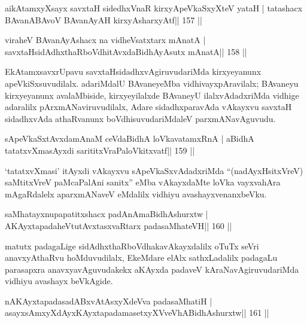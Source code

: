 \begin{shl}
aikAtamxyXsayx savxtaH sidedhxVnaR kirxyA\s peVkaSxyXteV yataH |
tatashacx BAvanABAvoV BAvanAyAH kirxyAsharxyAtf\hfill || 157 ||
\end{shl}

\begin{shl}
viraheV BAvanAyAshacx na vidheVsatxtarx mAnatA |
savxtaHsidAdhxthaRboVdhitAvxdaBidhAyAsutx mAnatA\hfill || 158 ||
\end{shl}

\begin{artha}
EkAtamxsavxrUpavu savxtaHsidadhxvAgiruvudariMda kirxyeyanunx apeVkiSxsuvudilalx. adariMdalU BAvaneyeMba vidhivayxpAravilalx; BAvaneyu kirxyeyanunx avalaMbiside, kirxyeyilalxde BAvaneyU ilalxvAdadxriMda vidhige adaralilx pArxmANaviruvudilalx, Adare sidadhxparavAda vAkayxvu savxtaH sidadhxvAda athaRvanunx boVdhisuvudariMdaleV parxmANavAguvudu.
\end{artha}


\begin{shl}
sApeVkaSxtAvxdamAnaM ceVdaBidhA loVkavatamxRnA |
aBidhA tatatxvXmasAyxdi sarititxVraPaloVkitxvatf\hfill || 159 ||
\end{shl}

\begin{artha}
`tatatxvXmasi' itAyxdi vAkayxvu sApeVkaSxvAdadxriMda ``(nadAyxHsitxVreV) saMtitxVreV paMcaPalAni sanitx'' eMba vAkayxdaMte loVka vayxvahAra mAgaRdalelx aparxmANaveV eMdalilx vidhiyu avashayxvenanxbeVku.
\end{artha}

\begin{shl}
saMhatayxnupapatitxshacx padAnAmaBidhAshurxtw |
AKAyxtapadaheVtutAvxtasxvaRtarx padasaMhateVH\hfill || 160 ||
\end{shl}

\begin{artha}
matutx padagaLige sidAdhxthaRboVdhakavAkayxdalilx oTuTx seVri anavxyAthaRvu hoMduvudilalx, EkeMdare elAlx sathxLadalilx padagaLu parasapxra anavxyavAguvudakekx aKAyxda padaveV kAraNavAgiruvudariMda vidhiyu avashayx beVkAgide.
\end{artha}


\begin{shl}
nA\s\s KAyxtapadasadABxvAtAsxyXdeVva padasaMhatiH |
asayxsAmxyXdAyxKAyxtapadamasetxyXVveVhABidhAshurxtw\hfill || 161 ||
\end{shl}

